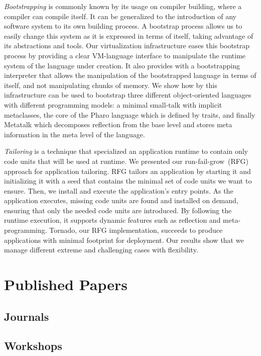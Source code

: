 \emph{Bootstrapping} is commonly known by its usage on compiler building, where a compiler can compile itself.
It can be generalized to the introduction of any software system to its own building process.
A bootstrap process allows us to easily change this system as it is expressed in terms of itself, taking advantage of its abstractions and tools.
Our virtualization infrastructure eases this bootstrap process by providing a clear VM-language interface to manipulate the runtime system of the language under creation. It also provides with a bootstrapping interpreter that allows the manipulation of the bootstrapped language in terms of itself, and not manipulating chunks of memory.
We show how by this infrastructure can be used to bootstrap three different object-oriented languages with different programming models: a minimal small-talk with implicit metaclasses, the core of the Pharo language which is defined by traits, and finally Metatalk which decomposes reflection from the base level and stores meta information in the meta level of the language.

\emph{Tailoring} is a technique that specialized an application runtime to contain only code units that will be used at runtime. We presented our run-fail-grow~(RFG) approach for application tailoring. RFG tailors an application by starting it and initializing it with a seed that contains the minimal set of code units we want to ensure. Then, we install and execute the application's entry points. As the application executes, missing code units are found and installed on demand, ensuring that only the needed code units are introduced. By following the runtime execution, it supports dynamic features such as reflection and meta-programming. Tornado, our RFG implementation, succeeds to produce applications with minimal footprint for deployment. Our results show that we manage different extreme and challenging cases with flexibility.

\section{Published Papers}

\subsection{Journals}

\subsection{Workshops}


